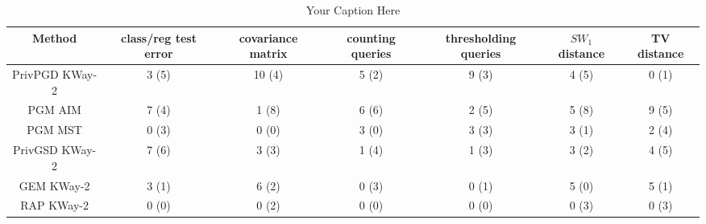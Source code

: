 \begin{table}[t!]
\centering
\begin{tabular}{ccccccc}
\toprule
Method & class/reg test error & covariance matrix & counting queries & thresholding queries & $SW_1$ distance & TV distance \\
\midrule
 PrivPGD KWay-2 & 3 (5) & 10 (4) & 5 (2) & 9 (3) & 4 (5) & 0 (1) \\
 PGM AIM & 7 (4) & 1 (8) & 6 (6) & 2 (5) & 5 (8) & 9 (5) \\
 PGM MST & 0 (3) & 0 (0) & 3 (0) & 3 (3) & 3 (1) & 2 (4) \\
 PrivGSD KWay-2 & 7 (6) & 3 (3) & 1 (4) & 1 (3) & 3 (2) & 4 (5) \\
 GEM KWay-2 & 3 (1) & 6 (2) & 0 (3) & 0 (1) & 5 (0) & 5 (1) \\
 RAP  KWay-2 & 0 (0) & 0 (2) & 0 (0) & 0 (0) & 0 (3) & 0 (3) \\
\bottomrule
\end{tabular}
\caption{Your Caption Here}
\label{tab:your_label}
\end{table}